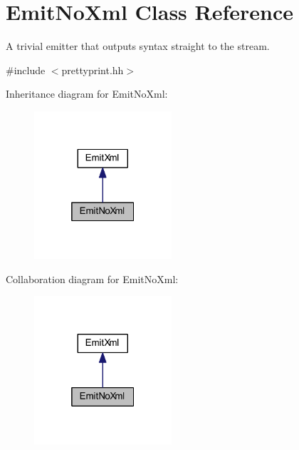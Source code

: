 \hypertarget{class_emit_no_xml}{}\section{Emit\+No\+Xml Class Reference}
\label{class_emit_no_xml}


A trivial emitter that outputs syntax straight to the stream.  




{\ttfamily \#include $<$prettyprint.\+hh$>$}



Inheritance diagram for Emit\+No\+Xml\+:
\nopagebreak
\begin{figure}[H]
\begin{center}
\leavevmode
\includegraphics[width=145pt]{class_emit_no_xml__inherit__graph}
\end{center}
\end{figure}


Collaboration diagram for Emit\+No\+Xml\+:
\nopagebreak
\begin{figure}[H]
\begin{center}
\leavevmode
\includegraphics[width=145pt]{class_emit_no_xml__coll__graph}
\end{center}
\end{figure}

